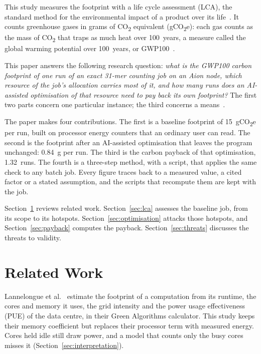 \documentclass[conference,a4paper]{IEEEtran}
\begin{document}
This study measures the footprint with a life cycle assessment (LCA), the
standard method for the environmental impact of a product over its
life~\cite{iso14040,iso14044}. It counts greenhouse gases in grams of
CO\textsubscript{2} equivalent (gCO\textsubscript{2}e): each gas counts as the
mass of CO\textsubscript{2} that traps as much heat over 100~years, a measure
called the global warming potential over 100~years, or GWP100~\cite{ipcc2021}.

This paper answers the following research question: \emph{what is the GWP100
carbon footprint of one run of an exact 31-mer counting job on an Aion node,
which resource of the job's allocation carries most of it, and how many runs
does an AI-assisted optimisation of that resource need to pay back its own
footprint?} The first two parts concern one particular instance; the third
concerns a means~\cite{shaw2003}.

The paper makes four contributions. The first is a baseline footprint of
15~gCO\textsubscript{2}e per run, built on processor energy counters that an
ordinary user can read. The second is the footprint after an AI-assisted
optimisation that leaves the program unchanged: 0.84~g per run. The third is
the carbon payback of that optimisation, 1.32~runs. The fourth is a three-step
method, with a script, that applies the same check to any batch job. Every
figure traces back to a measured value, a cited factor or a stated assumption,
and the scripts that recompute them are kept with the job.

Section~\ref{sec:related} reviews related work. Section~\ref{sec:lca} assesses
the baseline job, from its scope to its hotspots. Section~\ref{sec:optimisation} attacks those hotspots, and
Section~\ref{sec:payback} computes the payback. Section~\ref{sec:threats}
discusses the threats to validity.

\section{Related Work}\label{sec:related}
Lannelongue et al.~\cite{lannelongue2021} estimate the footprint of a
computation from its runtime, the cores and memory it uses, the grid intensity
and the power usage effectiveness (PUE) of the data centre, in their Green
Algorithms calculator. This study keeps their memory coefficient but replaces
their processor term with measured energy. Cores held idle still draw power, and
a model that counts only the busy cores misses it
(Section~\ref{sec:interpretation}).
\end{document}
